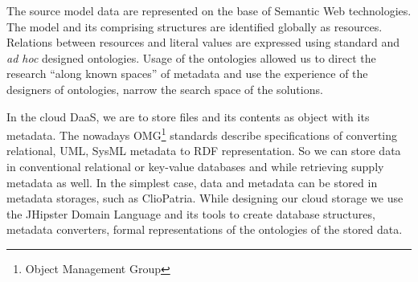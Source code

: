\documentclass[a4paper]{jpconf}
\begin{document}
The source model data are represented on the base of Semantic Web technologies.  The model and its comprising structures are identified globally as resources.  Relations between resources and literal values are expressed using standard and \emph{ad hoc} designed ontologies.  Usage of the ontologies allowed us to direct the research ``along known spaces'' of metadata and use the experience of the designers of ontologies, narrow the search space of the solutions.


In the cloud DaaS, we are to store files and its contents as object with its metadata.  The nowadays OMG\footnote{Object Management Group} standards describe specifications of converting relational, UML, SysML metadata to RDF representation.  So we can store data in conventional relational or key-value databases and while retrieving supply metadata as well.  In the simplest case, data and metadata can be stored in metadata storages, such as ClioPatria.  While designing our cloud storage we use the JHipster Domain Language \cite{jhipster} and its tools to create database structures, metadata converters, formal representations of the ontologies of the stored data.

\end{document}
